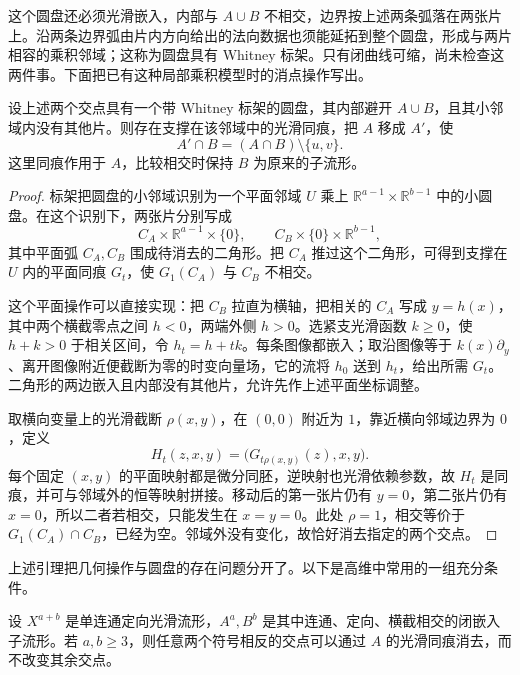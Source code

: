 \ProseParagraphBreak

这个圆盘还必须光滑嵌入，内部与 \(A\cup B\) 不相交，边界按上述两条弧落在两张片上。沿两条边界弧由片内方向给出的法向数据也须能延拓到整个圆盘，形成与两片相容的乘积邻域；这称为圆盘具有 Whitney 标架。只有闭曲线可缩，尚未检查这两件事。下面把已有这种局部乘积模型时的消点操作写出。

\begin{lemma}\label{g2:lem:local-whitney-move}
	设上述两个交点具有一个带 Whitney 标架的圆盘，其内部避开 \(A\cup B\)，且其小邻域内没有其他片。则存在支撑在该邻域中的光滑同痕，把 \(A\) 移成 \(A'\)，使
	\[
		A'\cap B=(A\cap B)\setminus\{u,v\}.
	\]
	这里同痕作用于 \(A\)，比较相交时保持 \(B\) 为原来的子流形。
\end{lemma}
\begin{proof}
	标架把圆盘的小邻域识别为一个平面邻域 \(U\) 乘上 \(\mathbb R^{a-1}\times\mathbb R^{b-1}\) 中的小圆盘。在这个识别下，两张片分别写成
	\[
		C_A\times\mathbb R^{a-1}\times\{0\},\qquad
		C_B\times\{0\}\times\mathbb R^{b-1},
	\]
	其中平面弧 \(C_A,C_B\) 围成待消去的二角形。把 \(C_A\) 推过这个二角形，可得到支撑在 \(U\) 内的平面同痕 \(G_t\)，使 \(G_1(C_A)\) 与 \(C_B\) 不相交。

	这个平面操作可以直接实现：把 \(C_B\) 拉直为横轴，把相关的 \(C_A\) 写成 \(y=h(x)\)，其中两个横截零点之间 \(h<0\)，两端外侧 \(h>0\)。选紧支光滑函数 \(k\ge0\)，使 \(h+k>0\) 于相关区间，令 \(h_t=h+tk\)。每条图像都嵌入；取沿图像等于 \(k(x)\partial_y\)、离开图像附近便截断为零的时变向量场，它的流将 \(h_0\) 送到 \(h_t\)，给出所需 \(G_t\)。二角形的两边嵌入且内部没有其他片，允许先作上述平面坐标调整。

	取横向变量上的光滑截断 \(\rho(x,y)\)，在 \((0,0)\) 附近为 \(1\)，靠近横向邻域边界为 \(0\)，定义
	\[
		H_t(z,x,y)=\bigl(G_{t\rho(x,y)}(z),x,y\bigr).
	\]
	每个固定 \((x,y)\) 的平面映射都是微分同胚，逆映射也光滑依赖参数，故 \(H_t\) 是同痕，并可与邻域外的恒等映射拼接。移动后的第一张片仍有 \(y=0\)，第二张片仍有 \(x=0\)，所以二者若相交，只能发生在 \(x=y=0\)。此处 \(\rho=1\)，相交等价于 \(G_1(C_A)\cap C_B\)，已经为空。邻域外没有变化，故恰好消去指定的两个交点。
\end{proof}

上述引理把几何操作与圆盘的存在问题分开了。以下是高维中常用的一组充分条件。

\begin{theorem}[Whitney 技巧]\label{g2:thm:whitney-trick}
	设 \(X^{a+b}\) 是单连通定向光滑流形，\(A^a,B^b\) 是其中连通、定向、横截相交的闭嵌入子流形。若 \(a,b\ge3\)，则任意两个符号相反的交点可以通过 \(A\) 的光滑同痕消去，而不改变其余交点。
\end{theorem}

